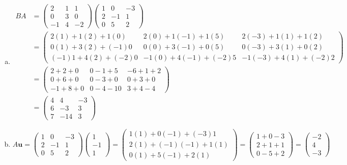 \documentclass[11pt,letterpaper]{article}
\begin{document}
\begin{enumerate}[(a)]
\item 
	\[
	\begin{aligned}
	BA&= \begin{pmatrix} 2 & 1 & 1 \\ 0 & 3 & 0 \\ -1 & 4 & -2 \end{pmatrix} \begin{pmatrix} 1 & 0 & -3 \\ 2 & -1 & 1 \\ 0 & 5 & 2 \end{pmatrix} \\[0.3cm]
	&= \begin{pmatrix} 2(1) + 1(2) + 1(0) & 2(0) + 1(-1) + 1(5) & 2(-3) + 1(1) + 1(2) \\ 0(1) + 3(2) + (-1)0 & 0(0) + 3(-1) + 0(5) & 0(-3) + 3(1) + 0(2) \\ (-1)1 + 4(2) + (-2)0 & -1(0) + 4(-1) + (-2)5 & -1(-3) + 4(1) + (-2)2 \end{pmatrix} \\[0.3cm]
	&= \begin{pmatrix} 2 + 2 + 0 & 0 - 1 + 5 & -6 + 1 + 2 \\ 0 + 6 + 0 & 0 - 3 + 0 & 0 + 3 + 0 \\ -1 + 8 + 0 & 0 - 4 - 10 & 3 + 4 - 4 \end{pmatrix} \\[0.3cm]
	&= \begin{pmatrix} 4 & 4 & -3 \\ 6 & -3 & 3 \\ 7 & -14 & 3 \end{pmatrix}
	\end{aligned}
	\] \pspace

\item 
	\[
	A\mathbf{u}= \begin{pmatrix} 1 & 0 & -3 \\ 2 & -1 & 1 \\ 0 & 5 & 2 \end{pmatrix} \begin{pmatrix} 1 \\ -1 \\ 1 \end{pmatrix}= \begin{pmatrix} 1(1) + 0(-1) + (-3)1 \\ 2(1) + (-1)(-1) + 1(1) \\ 0(1) + 5(-1) + 2(1) \end{pmatrix}= \begin{pmatrix} 1 + 0 - 3 \\ 2 + 1 + 1 \\ 0 - 5 + 2 \end{pmatrix}= \begin{pmatrix} -2 \\ 4 \\ -3 \end{pmatrix}
	\]
\end{enumerate}
\end{document}
